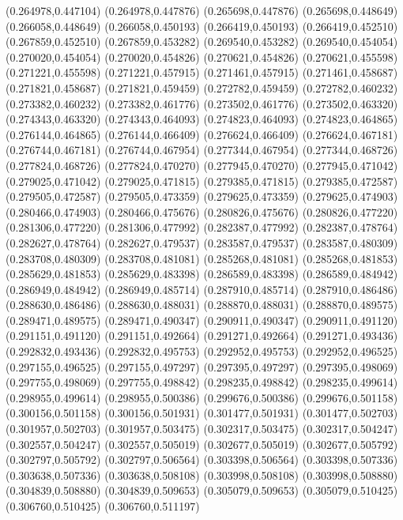 (0.264978,0.447104)
(0.264978,0.447876)
(0.265698,0.447876)
(0.265698,0.448649)
(0.266058,0.448649)
(0.266058,0.450193)
(0.266419,0.450193)
(0.266419,0.452510)
(0.267859,0.452510)
(0.267859,0.453282)
(0.269540,0.453282)
(0.269540,0.454054)
(0.270020,0.454054)
(0.270020,0.454826)
(0.270621,0.454826)
(0.270621,0.455598)
(0.271221,0.455598)
(0.271221,0.457915)
(0.271461,0.457915)
(0.271461,0.458687)
(0.271821,0.458687)
(0.271821,0.459459)
(0.272782,0.459459)
(0.272782,0.460232)
(0.273382,0.460232)
(0.273382,0.461776)
(0.273502,0.461776)
(0.273502,0.463320)
(0.274343,0.463320)
(0.274343,0.464093)
(0.274823,0.464093)
(0.274823,0.464865)
(0.276144,0.464865)
(0.276144,0.466409)
(0.276624,0.466409)
(0.276624,0.467181)
(0.276744,0.467181)
(0.276744,0.467954)
(0.277344,0.467954)
(0.277344,0.468726)
(0.277824,0.468726)
(0.277824,0.470270)
(0.277945,0.470270)
(0.277945,0.471042)
(0.279025,0.471042)
(0.279025,0.471815)
(0.279385,0.471815)
(0.279385,0.472587)
(0.279505,0.472587)
(0.279505,0.473359)
(0.279625,0.473359)
(0.279625,0.474903)
(0.280466,0.474903)
(0.280466,0.475676)
(0.280826,0.475676)
(0.280826,0.477220)
(0.281306,0.477220)
(0.281306,0.477992)
(0.282387,0.477992)
(0.282387,0.478764)
(0.282627,0.478764)
(0.282627,0.479537)
(0.283587,0.479537)
(0.283587,0.480309)
(0.283708,0.480309)
(0.283708,0.481081)
(0.285268,0.481081)
(0.285268,0.481853)
(0.285629,0.481853)
(0.285629,0.483398)
(0.286589,0.483398)
(0.286589,0.484942)
(0.286949,0.484942)
(0.286949,0.485714)
(0.287910,0.485714)
(0.287910,0.486486)
(0.288630,0.486486)
(0.288630,0.488031)
(0.288870,0.488031)
(0.288870,0.489575)
(0.289471,0.489575)
(0.289471,0.490347)
(0.290911,0.490347)
(0.290911,0.491120)
(0.291151,0.491120)
(0.291151,0.492664)
(0.291271,0.492664)
(0.291271,0.493436)
(0.292832,0.493436)
(0.292832,0.495753)
(0.292952,0.495753)
(0.292952,0.496525)
(0.297155,0.496525)
(0.297155,0.497297)
(0.297395,0.497297)
(0.297395,0.498069)
(0.297755,0.498069)
(0.297755,0.498842)
(0.298235,0.498842)
(0.298235,0.499614)
(0.298955,0.499614)
(0.298955,0.500386)
(0.299676,0.500386)
(0.299676,0.501158)
(0.300156,0.501158)
(0.300156,0.501931)
(0.301477,0.501931)
(0.301477,0.502703)
(0.301957,0.502703)
(0.301957,0.503475)
(0.302317,0.503475)
(0.302317,0.504247)
(0.302557,0.504247)
(0.302557,0.505019)
(0.302677,0.505019)
(0.302677,0.505792)
(0.302797,0.505792)
(0.302797,0.506564)
(0.303398,0.506564)
(0.303398,0.507336)
(0.303638,0.507336)
(0.303638,0.508108)
(0.303998,0.508108)
(0.303998,0.508880)
(0.304839,0.508880)
(0.304839,0.509653)
(0.305079,0.509653)
(0.305079,0.510425)
(0.306760,0.510425)
(0.306760,0.511197)
